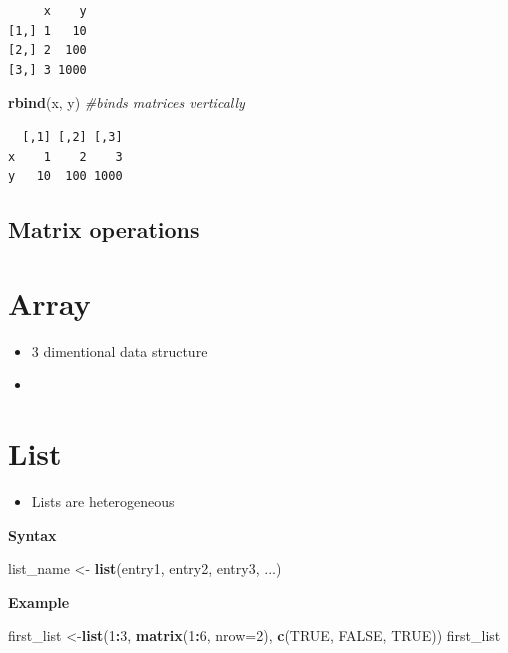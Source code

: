 \documentclass[]{book}
\newenvironment{Shaded}{\begin{snugshade}}{\end{snugshade}}
\newcommand{\CommentTok}[1]{\textcolor[rgb]{0.56,0.35,0.01}{\textit{#1}}}
\newcommand{\DataTypeTok}[1]{\textcolor[rgb]{0.13,0.29,0.53}{#1}}
\newcommand{\DecValTok}[1]{\textcolor[rgb]{0.00,0.00,0.81}{#1}}
\newcommand{\KeywordTok}[1]{\textcolor[rgb]{0.13,0.29,0.53}{\textbf{#1}}}
\newcommand{\NormalTok}[1]{#1}
\newcommand{\OperatorTok}[1]{\textcolor[rgb]{0.81,0.36,0.00}{\textbf{#1}}}
\newcommand{\OtherTok}[1]{\textcolor[rgb]{0.56,0.35,0.01}{#1}}
\newcommand{\StringTok}[1]{\textcolor[rgb]{0.31,0.60,0.02}{#1}}
\providecommand{\tightlist}{%
  \setlength{\itemsep}{0pt}\setlength{\parskip}{0pt}}
\begin{document}
\begin{verbatim}
     x    y
[1,] 1   10
[2,] 2  100
[3,] 3 1000
\end{verbatim}

\begin{Shaded}
\begin{Highlighting}[]
\KeywordTok{rbind}\NormalTok{(x, y) }\CommentTok{#binds matrices vertically}
\end{Highlighting}
\end{Shaded}

\begin{verbatim}
  [,1] [,2] [,3]
x    1    2    3
y   10  100 1000
\end{verbatim}

\hypertarget{matrix-operations}{%
\subsection{Matrix operations}\label{matrix-operations}}

\hypertarget{array}{%
\section{Array}\label{array}}

\begin{itemize}
\item
  3 dimentional data structure
\item
\end{itemize}

\hypertarget{list}{%
\section{List}\label{list}}

\begin{itemize}
\tightlist
\item
  Lists are heterogeneous
\end{itemize}

\textbf{Syntax}

\begin{Shaded}
\begin{Highlighting}[]
\NormalTok{list_name <-}\StringTok{ }\KeywordTok{list}\NormalTok{(entry1, entry2, entry3, ...)}
\end{Highlighting}
\end{Shaded}

\textbf{Example}

\begin{Shaded}
\begin{Highlighting}[]
\NormalTok{first_list <-}\KeywordTok{list}\NormalTok{(}\DecValTok{1}\OperatorTok{:}\DecValTok{3}\NormalTok{, }\KeywordTok{matrix}\NormalTok{(}\DecValTok{1}\OperatorTok{:}\DecValTok{6}\NormalTok{, }\DataTypeTok{nrow=}\DecValTok{2}\NormalTok{), }\KeywordTok{c}\NormalTok{(}\OtherTok{TRUE}\NormalTok{, }\OtherTok{FALSE}\NormalTok{, }\OtherTok{TRUE}\NormalTok{))}
\NormalTok{first_list}
\end{Highlighting}
\end{Shaded}
\end{document}
